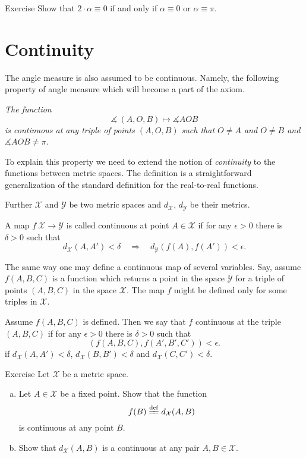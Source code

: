 \begin{thm}{Exercise}\label{ex:2a=0}
Show that $2\cdot\alpha\equiv0$ if and only if $\alpha\equiv0$ or $\alpha\equiv\pi$.
\end{thm}

\section*{Continuity}

The angle measure is also assumed to be continuous.
Namely, the following property of angle measure which will become a part of the axiom.

\textit{The function}
$$\measuredangle\:(A,O,B)\mapsto\measuredangle A O B$$
\textit{is continuous at any triple of points $(A,O,B)$
such that $O\ne A$ and $O\ne B$ and $\measuredangle A O B\ne\pi$.}

To explain this property we need to extend the notion of {}\emph{continuity} to the functions between metric spaces.
The definition is a straightforward generalization of the standard definition for the real-to-real functions.

Further $\mathcal X$ and $\mathcal Y$ be two metric spaces 
and $d_{\mathcal X}$, $d_{\mathcal Y}$ be their metrics.

A map $f\:\mathcal X\to\mathcal Y$ is called continuous at point $A\in \mathcal X$
if for any  $\epsilon>0$ there is $\delta>0$ such that 
\[d_{\mathcal X}(A,A')
<
\delta
\quad
\Rightarrow
\quad
d_{\mathcal Y}(f(A),f(A'))
<
\epsilon.\]

The same way one may define a continuous map of several variables.
Say, assume $f(A,B,C)$ is a function which returns a point in the space $\mathcal Y$ for a triple of points $(A,B,C)$
in the space $\mathcal X$.
The map $f$ might be defined only for some triples in $\mathcal X$.

Assume $f(A,B,C)$ is defined.
Then we say that $f$ continuous at the triple $(A,B,C)$ 
if for any $\epsilon>0$ there is $\delta>0$ such that 
\[(f(A,B,C),f(A',B',C'))<\epsilon.\]
if $d_{\mathcal X}(A,A')<\delta$, $d_{\mathcal X}(B,B')<\delta$ and $d_{\mathcal X}(C,C')<\delta$.


\begin{thm}{Exercise}\label{ex:dist-cont}
Let $\mathcal{X}$ be a metric space.
\begin{enumerate}[(a)]
\item\label{ex:dist-cont:a} Let $A\in \mathcal{X}$ be a fixed point.
Show that the function 
$$f(B)\df
d_{\mathcal{X}}(A,B)$$ 
is continuous at any point $B$.
\item Show that $d_{\mathcal{X}}(A,B)$ is a continuous  at any pair $A,B\in \mathcal{X}$.
\end{enumerate}

\end{thm}

